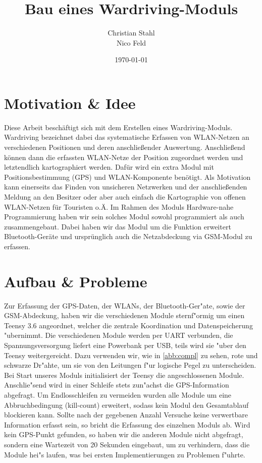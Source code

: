 \documentclass[a4paper,11pt, ngerman]{scrartcl}
\author{Christian Stahl\\Nico Feld}
\title{Bau eines Wardriving-Moduls}
\date{\today}
\begin{document}
\maketitle
\pagebreak
{}
\tableofcontents
\pagebreak
\section{Motivation \& Idee}
Diese Arbeit beschäftigt sich mit dem Erstellen eines Wardriving-Moduls. \grqq Wardriving\grqq{} bezeichnet dabei das systematische Erfassen von WLAN-Netzen an verschiedenen Positionen und deren anschließender Auswertung. Anschließend können dann die erfassten WLAN-Netze der Position zugeordnet werden und letztendlich kartographiert werden. Dafür wird ein extra Modul mit Positionsbestimmung (GPS) und WLAN-Komponente benötigt. Als Motivation kann einerseits das Finden von unsicheren Netzwerken und der anschließenden Meldung an den Besitzer oder aber auch einfach die Kartographie von offenen WLAN-Netzen für Touristen o.Ä. Im Rahmen des Moduls \grqq Hardware-nahe Programmierung\grqq{} haben wir sein solches Modul sowohl programmiert als auch zusammengebaut. Dabei haben wir das Modul um die Funktion erweitert Bluetooth-Geräte und ursprünglich auch die Netzabdeckung via GSM-Modul zu erfassen.
\section{Aufbau \& Probleme}
Zur Erfassung der GPS-Daten, der WLANs, der Bluetooth-Ger"ate, sowie der GSM-Abdeckung, haben wir die verschiedenen Module sternf"ormig um einen Teensy 3.6 angeordnet, welcher die zentrale Koordination und Datenspeicherung "ubernimmt. Die verschiedenen Module werden per UART verbunden, die Spannungsversorgung liefert eine Powerbank per USB, teils wird sie "uber den Teensy weitergereicht. Dazu verwenden wir, wie in \cref{abb:compl} zu sehen, rote und schwarze Dr"ahte, um sie von den Leitungen f"ur logische Pegel zu unterscheiden.\\
Bei Start unseres Moduls initialisiert der Teensy die angeschlossenen Module. Anschlie"send wird in einer Schleife stets zun"achst die GPS-Information abgefragt. Um Endlosschleifen zu vermeiden wurden alle Module um eine Abbruchbedingung (kill-count) erweitert, sodass kein Modul den Gesamtablauf blockieren kann. Sollte nach der gegebenen Anzahl Versuche keine verwertbare Information erfasst sein, so bricht die Erfassung des einzelnen Moduls ab. Wird kein GPS-Punkt gefunden, so haben wir die anderen Module nicht abgefragt, sondern eine Wartezeit von 20 Sekunden eingebaut, um zu verhindern, dass die Module hei"s laufen, was bei ersten Implementierungen zu Problemen f"uhrte.
\end{document}
